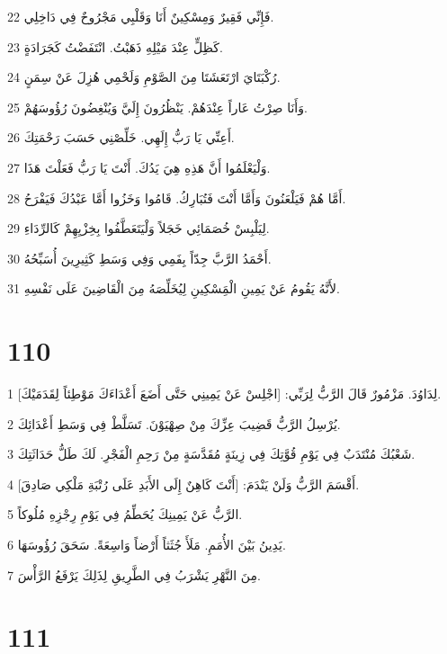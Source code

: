 \par 22 فَإِنِّي فَقِيرٌ وَمِسْكِينٌ أَنَا وَقَلْبِي مَجْرُوحٌ فِي دَاخِلِي.
\par 23 كَظِلٍّ عِنْدَ مَيْلِهِ ذَهَبْتُ. انْتَفَضْتُ كَجَرَادَةٍ.
\par 24 رُكْبَتَايَ ارْتَعَشَتَا مِنَ الصَّوْمِ وَلَحْمِي هُزِلَ عَنْ سِمَنٍ.
\par 25 وَأَنَا صِرْتُ عَاراً عِنْدَهُمْ. يَنْظُرُونَ إِلَيَّ وَيُنْغِضُونَ رُؤُوسَهُمْ.
\par 26 أَعِنِّي يَا رَبُّ إِلَهِي. خَلِّصْنِي حَسَبَ رَحْمَتِكَ.
\par 27 وَلْيَعْلَمُوا أَنَّ هَذِهِ هِيَ يَدُكَ. أَنْتَ يَا رَبُّ فَعَلْتَ هَذَا.
\par 28 أَمَّا هُمْ فَيَلْعَنُونَ وَأَمَّا أَنْتَ فَتُبَارِكُ. قَامُوا وَخَزُوا أَمَّا عَبْدُكَ فَيَفْرَحُ.
\par 29 لِيَلْبِسْ خُصَمَائِي خَجَلاً وَلْيَتَعَطَّفُوا بِخِزْيِهِمْ كَالرِّدَاءِ.
\par 30 أَحْمَدُ الرَّبَّ جِدّاً بِفَمِي وَفِي وَسَطِ كَثِيرِينَ أُسَبِّحُهُ.
\par 31 لأَنَّهُ يَقُومُ عَنْ يَمِينِ الْمَِسْكِينِ لِيُخَلِّصَهُ مِنَ الْقَاضِينَ عَلَى نَفْسِهِ.

\chapter{110}

\par 1 لِدَاوُدَ. مَزْمُورٌ قَالَ الرَّبُّ لِرَبِّي: [اجْلِسْ عَنْ يَمِينِي حَتَّى أَضَعَ أَعْدَاءَكَ مَوْطِئاً لِقَدَمَيْكَ].
\par 2 يُرْسِلُ الرَّبُّ قَضِيبَ عِزِّكَ مِنْ صِهْيَوْنَ. تَسَلَّطْ فِي وَسَطِ أَعْدَائِكَ.
\par 3 شَعْبُكَ مُنْتَدَبٌ فِي يَوْمِ قُوَّتِكَ فِي زِينَةٍ مُقَدَّسَةٍ مِنْ رَحِمِ الْفَجْرِ. لَكَ طَلُّ حَدَاثَتِكَ.
\par 4 أَقْسَمَ الرَّبُّ وَلَنْ يَنْدَمَ: [أَنْتَ كَاهِنٌ إِلَى الأَبَدِ عَلَى رُتْبَةِ مَلْكِي صَادِقَ].
\par 5 الرَّبُّ عَنْ يَمِينِكَ يُحَطِّمُ فِي يَوْمِ رِجْزِهِ مُلُوكاً.
\par 6 يَدِينُ بَيْنَ الأُمَمِ. مَلَأَ جُثَثاً أَرْضاً وَاسِعَةً. سَحَقَ رُؤُوسَهَا.
\par 7 مِنَ النَّهْرِ يَشْرَبُ فِي الطَّرِيقِ لِذَلِكَ يَرْفَعُ الرَّأْسَ.

\chapter{111}

